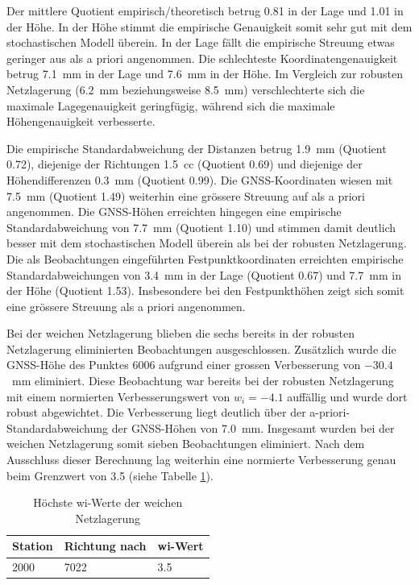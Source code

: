 Der mittlere Quotient empirisch/theoretisch betrug 0.81 in der Lage und 1.01 in der Höhe.
In der Höhe stimmt die empirische Genauigkeit somit sehr gut mit dem stochastischen Modell
überein. In der Lage fällt die empirische Streuung etwas geringer aus als a priori angenommen.
Die schlechteste Koordinatengenauigkeit betrug 7.1~mm in der Lage und 7.6~mm in der Höhe.
Im Vergleich zur robusten Netzlagerung (6.2~mm beziehungsweise 8.5~mm) verschlechterte sich
die maximale Lagegenauigkeit geringfügig, während sich die maximale Höhengenauigkeit verbesserte. \bigskip

Die empirische Standardabweichung der Distanzen betrug 1.9~mm (Quotient 0.72), diejenige der
Richtungen 1.5~cc (Quotient 0.69) und diejenige der Höhendifferenzen 0.3~mm (Quotient 0.99).
Die GNSS-Koordinaten wiesen mit 7.5~mm (Quotient 1.49) weiterhin eine grössere Streuung auf
als a priori angenommen. Die GNSS-Höhen erreichten hingegen eine empirische Standardabweichung
von 7.7~mm (Quotient 1.10) und stimmen damit deutlich besser mit dem stochastischen Modell
überein als bei der robusten Netzlagerung. Die als Beobachtungen eingeführten Festpunktkoordinaten
erreichten empirische Standardabweichungen von 3.4~mm in der Lage (Quotient 0.67) und 7.7~mm in
der Höhe (Quotient 1.53). Insbesondere bei den Festpunkthöhen zeigt sich somit eine grössere Streuung
als a priori angenommen. \bigskip

Bei der weichen Netzlagerung blieben die sechs bereits in der robusten Netzlagerung eliminierten
Beobachtungen ausgeschlossen. Zusätzlich wurde die GNSS-Höhe des Punktes 6006 aufgrund einer
grossen Verbesserung von $-30.4$~mm eliminiert. Diese Beobachtung war bereits bei der robusten
Netzlagerung mit einem normierten Verbesserungswert von $w_i=-4.1$ auffällig und wurde dort robust
abgewichtet. Die Verbesserung liegt deutlich über der a-priori-Standardabweichung der GNSS-Höhen
von 7.0~mm. Insgesamt wurden bei der weichen Netzlagerung somit sieben Beobachtungen eliminiert.
Nach dem Ausschluss dieser Berechnung lag weiterhin eine normierte Verbesserung genau beim Grenzwert von 3.5
(siehe Tabelle \ref{tab:wi-werte-weiche-netzlagerung}).

\begin{table}[H]
    \centering
    \begin{tabularx}{\textwidth}{p{2.2cm} X X}
        \toprule
        Station & Richtung nach & wi-Wert \\
        \midrule
        2000 & 7022 & 3.5  \\
        \bottomrule
    \end{tabularx}
    \caption{Höchste wi-Werte der weichen Netzlagerung}
    \label{tab:wi-werte-weiche-netzlagerung}
\end{table}

